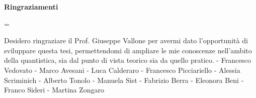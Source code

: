 \cleardoublepage
\thispagestyle{empty}
\vspace*{\fill}
\centerline{\large\bfseries Ringraziamenti}
\nobreak
\vspace{1pc}
\begingroup\small
{}\textwidth
\rightskip=\leftskip

Desidero ringraziare il Prof. Giuseppe Vallone per avermi
dato l’opportunità di sviluppare questa tesi, permettendomi di ampliare
le mie conoscenze nell’ambito della quantistica, sia
dal punto di vista teorico sia da quello pratico.
- Francesco Vedovato
- Marco Avesani
- Luca Calderaro
- Francesco Picciariello
- Alessia Scriminich
- Alberto Tonolo
- Manuela Sist
- Fabrizio Berra
- Eleonora Beni
- Franco Sideri
- Martina Zongaro

\par\endgroup
\vspace{\fill}
\clearpage
